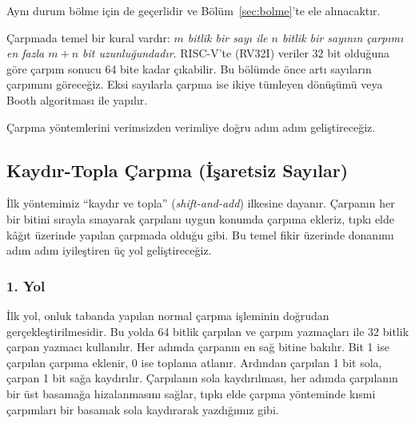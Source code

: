 Aynı durum bölme için de geçerlidir ve Bölüm~\ref{sec:bolme}'te ele alınacaktır.

Çarpmada temel bir kural vardır: \emph{$m$ bitlik bir sayı ile $n$ bitlik bir sayının çarpımı en fazla $m+n$ bit uzunluğundadır}. RISC-V'te (RV32I) veriler 32 bit olduğuna göre çarpım sonucu 64 bite kadar çıkabilir. Bu bölümde önce artı sayıların çarpımını göreceğiz. Eksi sayılarla çarpma ise ikiye tümleyen dönüşümü veya Booth algoritması ile yapılır.

Çarpma yöntemlerini verimsizden verimliye doğru adım adım geliştireceğiz.

\subsection{Kaydır-Topla Çarpma (İşaretsiz Sayılar)}
\label{sec:kaydir-topla-carpma}

İlk yöntemimiz ``kaydır ve topla'' (\emph{shift-and-add}) ilkesine dayanır. Çarpanın her bir bitini sırayla sınayarak çarpılanı uygun konumda çarpıma ekleriz, tıpkı elde kâğıt üzerinde yapılan çarpmada olduğu gibi. Bu temel fikir üzerinde donanımı adım adım iyileştiren üç yol geliştireceğiz.

\subsubsection{1. Yol}

İlk yol, onluk tabanda yapılan normal çarpma işleminin doğrudan gerçekleştirilmesidir. Bu yolda 64 bitlik çarpılan ve çarpım yazmaçları ile 32 bitlik çarpan yazmacı kullanılır. Her adımda çarpanın en sağ bitine bakılır. Bit 1 ise çarpılan çarpıma eklenir, 0 ise toplama atlanır. Ardından çarpılan 1 bit sola, çarpan 1 bit sağa kaydırılır. Çarpılanın sola kaydırılması, her adımda çarpılanın bir üst basamağa hizalanmasını sağlar, tıpkı elde çarpma yönteminde kısmi çarpımları bir basamak sola kaydırarak yazdığımız gibi.

